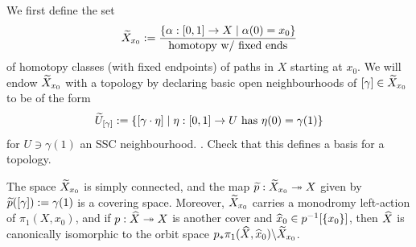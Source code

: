 We first define the set 
\[
	\widetilde{X}_{x_0} := \frac{\{\alpha:[0,1] \to X \mid \alpha(0)=x_0\}}{\text{homotopy w/ fixed ends}}
\]
of homotopy classes (with fixed endpoints) of paths in $X$ starting at $x_0$. We will endow $\wt{X}_{x_0}$ with a topology by declaring basic open neighbourhoods of $[\gamma] \in \widetilde{X}_{x_0}$ to be of the form 
\[
	\widetilde{U}_{[\gamma]} := \{[\gamma \cdot \eta] \mid \eta:[0,1] \to U \,\, \text{has}\,\, \eta(0)=\gamma(1)\}
\]
for $U \ni \gamma(1)$ an SSC neighbourhood. \Exc. Check that this defines a basis for a topology.

\begin{thm}[Universality of $\wt{X}_{x_0}$]
	\label{thm:universal_cover}
	The space $\wt{X}_{x_0}$ is simply connected, and the map $\widetilde{p} : \widetilde{X}_{x_0} \twoheadrightarrow X$ given by $\widetilde{p}([\gamma]) := \gamma(1)$ is a covering space. Moreover, $\wt{X}_{x_0}$ carries a monodromy left-action of $\pi_1(X, x_0)$, and if $p : \widehat{X} \twoheadrightarrow X$ is another cover and $\widehat{x}_0 \in p^{-1}[\{x_0\}]$, then $\widehat{X}$ is canonically isomorphic to the orbit space $p_*\pi_1(\widehat{X},\widehat{x}_0) \backslash \widetilde{X}_{x_0}$.
\end{thm}
